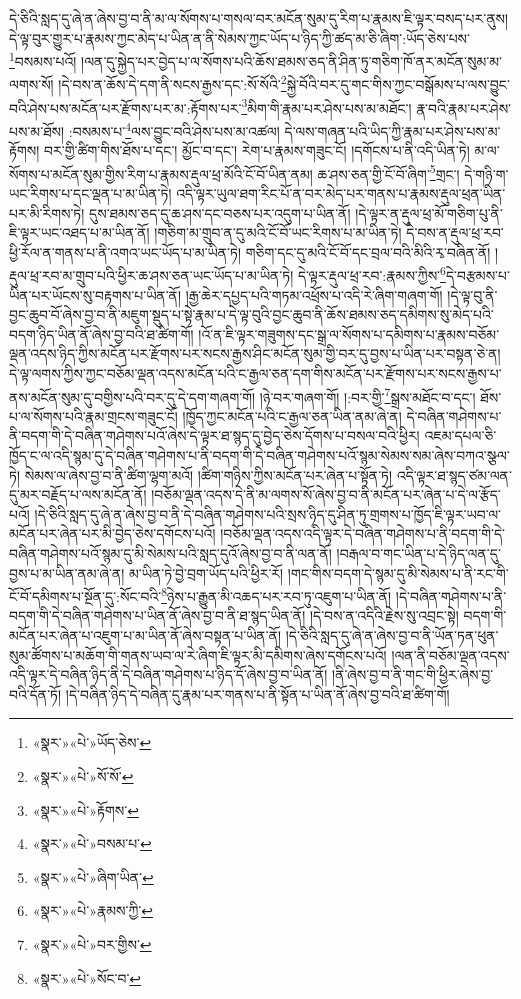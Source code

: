 དེ་ཅིའི་སླད་དུ་ཞེ་ན་ཞེས་བྱ་བ་ནི་མ་ལ་སོགས་པ་གསལ་བར་མངོན་སུམ་དུ་རིག་པ་རྣམས་ཇི་ལྟར་བསད་པར་ནུས། དེ་ལྟ་བུར་གྱུར་པ་རྣམས་ཀྱང་མེད་པ་ཡིན་ན་ནི་སེམས་ཀྱང་ཡོད་པ་ཉིད་ཀྱི་ཚད་མ་ཅི་ཞིག་:ཡོད་ཅེས་པས་\footnote{«སྣར་»«པེ་»ཡོད་ཅེས་}བསམས་པའོ། །ལན་དུ་སྐྱེད་པར་བྱེད་པ་ལ་སོགས་པའི་ཆོས་ཐམས་ཅད་ནི་ཤིན་ཏུ་གཅིག་ཁོ་ནར་མངོན་སུམ་མ་ལགས་སོ། །དེ་བས་ན་ཆོས་དེ་དག་ནི་སངས་རྒྱས་དང་:སོ་སོའི་\footnote{«སྣར་»«པེ་»སོ་སོ་}སྐྱེ་བོའི་བར་དུ་གང་གིས་ཀྱང་བསྒོམས་པ་ལས་བྱུང་བའི་ཤེས་པས་མངོན་པར་རྫོགས་པར་མ་:རྟོགས་པར་\footnote{«སྣར་»«པེ་»རྟོགས་}མིག་གི་རྣམ་པར་ཤེས་པས་མ་མཐོང་། རྣ་བའི་རྣམ་པར་ཤེས་པས་མ་ཐོས། :བསམས་པ་\footnote{«སྣར་»«པེ་»བསམ་པ་}ལས་བྱུང་བའི་ཤེས་པས་མ་འཚལ། དེ་ལས་གཞན་པའི་ཡིད་ཀྱི་རྣམ་པར་ཤེས་པས་མ་རྟོགས། བར་གྱི་ཚིག་གིས་ཐོས་པ་དང་། མྱོང་བ་དང་། རེག་པ་རྣམས་གཟུང་ངོ། །དགོངས་པ་ནི་འདི་ཡིན་ཏེ། མ་ལ་སོགས་པ་མངོན་སུམ་གྱིས་རིག་པ་རྣམས་རྡུལ་ཕྲ་མོའི་ངོ་བོ་ཡིན་ནམ། ཆ་ཤས་ཅན་གྱི་ངོ་བོ་ཞིག་\footnote{«སྣར་»«པེ་»ཞིག་ཡིན་}གྲང་། དེ་གཉི་ག་ཡང་རིགས་པ་དང་ལྡན་པ་མ་ཡིན་ཏེ། འདི་ལྟར་ཡུལ་ཐག་རིང་པོ་ན་བར་མེད་པར་གནས་པ་རྣམས་རྡུལ་ཕྲན་ཡིན་པར་མི་རིགས་ཏེ། དུས་ཐམས་ཅད་དུ་ཆ་ཤས་དང་བཅས་པར་འདུག་པ་ཡིན་ནོ། །དེ་ལྟར་ན་རྡུལ་ཕྲ་མོ་གཅིག་པུ་ནི་ཇི་ལྟར་ཡང་འཐད་པ་མ་ཡིན་ནོ། །གཅིག་མ་གྲུབ་ན་དུ་མའི་ངོ་བོ་ཡང་རིགས་པ་མ་ཡིན་ཏེ། དེ་བས་ན་རྡུལ་ཕྲ་རབ་ཕྱི་རོལ་ན་གནས་པ་ནི་འགའ་ཡང་ཡོད་པ་མ་ཡིན་ཏེ། གཅིག་དང་དུ་མའི་ངོ་བོ་དང་བྲལ་བའི་མིའི་རྭ་བཞིན་ནོ། །རྡུལ་ཕྲ་རབ་མ་གྲུབ་པའི་ཕྱིར་ཆ་ཤས་ཅན་ཡང་ཡོད་པ་མ་ཡིན་ཏེ། དེ་ལྟར་རྡུལ་ཕྲ་རབ་:རྣམས་ཀྱིས་\footnote{«སྣར་»«པེ་»རྣམས་ཀྱི་}དེ་བརྩམས་པ་ཡིན་པར་ཡོངས་སུ་བརྟགས་པ་ཡིན་ནོ། །རྒྱ་ཆེར་དཔྱད་པའི་གཏམ་འཕྲོས་པ་འདི་རེ་ཞིག་གཞག་གོ། །དེ་ལྟ་བུ་ནི་བྱང་ཆུབ་བོ་ཞེས་བྱ་བ་ནི་མཇུག་སྡུད་པ་སྟེ་རྣམ་པ་དེ་ལྟ་བུའི་བྱང་ཆུབ་ནི་ཆོས་ཐམས་ཅད་དམིགས་སུ་མེད་པའི་བདག་ཉིད་ཡིན་ནོ་ཞེས་བྱ་བའི་ཐ་ཚིག་གོ། །འོ་ན་ཇི་ལྟར་གཟུགས་དང་སྒྲ་ལ་སོགས་པ་དམིགས་པ་རྣམས་བཅོམ་ལྡན་འདས་ཉིད་ཀྱིས་མངོན་པར་རྫོགས་པར་སངས་རྒྱས་ཤིང་མངོན་སུམ་གྱི་བར་དུ་བྱས་པ་ཡིན་པར་བསྟན་ཅེ་ན། དེ་ལྟ་ལགས་ཀྱིས་ཀྱང་བཅོམ་ལྡན་འདས་མངོན་པའི་ང་རྒྱལ་ཅན་དག་གིས་མངོན་པར་རྫོགས་པར་སངས་རྒྱས་པ་ནས་མངོན་སུམ་དུ་བགྱིས་པའི་བར་དུ་དེ་དག་གཞག་གོ། །ཉེ་བར་གཞག་གོ། །:བར་གྱི་\footnote{«སྣར་»«པེ་»བར་གྱིས་}སྒྲས་མཐོང་བ་དང་། ཐོས་པ་ལ་སོགས་པའི་རྣམ་གྲངས་གཟུང་ངོ། །ཁྱོད་ཀྱང་མངོན་པའི་ང་རྒྱལ་ཅན་ཡིན་ནམ་ཞེ་ན། དེ་བཞིན་གཤེགས་པ་ནི་བདག་གི་དེ་བཞིན་གཤེགས་པའོ་ཞེས་དེ་ལྟར་ཐ་སྙད་དུ་བྱེད་ཅེས་དོགས་པ་བསལ་བའི་ཕྱིར། འཇམ་དཔལ་ཅི་ཁྱོད་ང་ལ་འདི་སྙམ་དུ་དེ་བཞིན་གཤེགས་པ་ནི་བདག་གི་དེ་བཞིན་གཤེགས་པའོ་སྙམ་སེམས་སམ་ཞེས་བཀའ་སྩལ་ཏེ། སེམས་ལ་ཞེས་བྱ་བ་ནི་ཚིག་ལྷག་མའོ། །ཚིག་གཉིས་ཀྱིས་མངོན་པར་ཞེན་པ་སྟོན་ཏེ། འདི་ལྟར་ཐ་སྙད་ཙམ་ལན་དུ་མར་བརྗོད་པ་ལས་མངོན་ནོ། །བཅོམ་ལྡན་འདས་དེ་ནི་མ་ལགས་སོ་ཞེས་བྱ་བ་ནི་མངོན་པར་ཞེན་པ་དེ་ལ་རྩོད་པའོ། །དེ་ཅིའི་སླད་དུ་ཞེ་ན་ཞེས་བྱ་བ་ནི་དེ་བཞིན་གཤེགས་པའི་སྲས་ཉིད་དུ་ཤིན་ཏུ་གྲགས་པ་ཁྱོད་ཇི་ལྟར་ཡབ་ལ་མངོན་པར་ཞེན་པར་མི་བྱེད་ཅེས་དགོངས་པའོ། །བཅོམ་ལྡན་འདས་འདི་ལྟར་དེ་བཞིན་གཤེགས་པ་ནི་བདག་གི་དེ་བཞིན་གཤེགས་པའོ་སྙམ་དུ་མི་སེམས་པའི་སླད་དུའོ་ཞེས་བྱ་བ་ནི་ལན་ནོ། །བརྒལ་བ་གང་ཡིན་པ་དེ་ཉིད་ལན་དུ་བྱས་པ་མ་ཡིན་ནམ་ཞེ་ན། མ་ཡིན་ཏེ་བྱེ་བྲག་ཡོད་པའི་ཕྱིར་རོ། །གང་གིས་བདག་དེ་སྙམ་དུ་མི་སེམས་པ་ནི་རང་གི་ངོ་བོ་དམིགས་པ་སྔོན་དུ་:སོང་བའི་\footnote{«སྣར་»«པེ་»སོང་བ་}ཉེས་པ་རྒྱུན་མི་འཆད་པར་རབ་ཏུ་འཇུག་པ་ཡིན་ནོ། །དེ་བཞིན་གཤེགས་པ་ནི་བདག་གི་དེ་བཞིན་གཤེགས་པ་ཡིན་ནོ་ཞེས་བྱ་བ་ནི་ཐ་སྙད་ཡིན་ནོ། །དེ་བས་ན་འདིའི་རྗེས་སུ་འབྲང་སྟེ། བདག་གི་མངོན་པར་ཞེན་པ་འཇུག་པ་མ་ཡིན་ནོ་ཞེས་བསྟན་པ་ཡིན་ནོ། །དེ་ཅིའི་སླད་དུ་ཞེ་ན་ཞེས་བྱ་བ་ནི་ཡོན་ཏན་ཕུན་སུམ་ཚོགས་པ་མཆོག་གི་གནས་ཡབ་ལ་རེ་ཞིག་ཇི་ལྟར་མི་དམིགས་ཞེས་དགོངས་པའོ། །ལན་ནི་བཅོམ་ལྡན་འདས་འདི་ལྟར་དེ་བཞིན་ཉིད་ནི་དེ་བཞིན་གཤེགས་པ་ཉིད་དོ་ཞེས་བྱ་བ་ཡིན་ནོ། །ནི་ཞེས་བྱ་བ་ནི་གང་གི་ཕྱིར་ཞེས་བྱ་བའི་དོན་ཏོ། །དེ་བཞིན་ཉིད་དེ་བཞིན་དུ་རྣམ་པར་གནས་པ་ནི་སྟོན་པ་ཡིན་ནོ་ཞེས་བྱ་བའི་ཐ་ཚིག་གོ། 